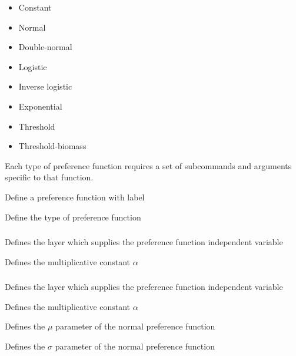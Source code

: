 \begin{itemize}
	\item Constant
	\item Normal
	\item Double-normal
	\item Logistic
	\item Inverse logistic
	\item Exponential
	\item Threshold
	\item Threshold-biomass	
\end{itemize}

Each type of preference function requires a set of subcommands and arguments specific to that function.

 {Define a preference function with label}

 {Define the type of preference function}

\subsubsection[Constant]{}

 {Defines the layer which supplies the preference function independent variable}

 {Defines the multiplicative constant $\alpha$}

\subsubsection[Normal]{}

 {Defines the layer which supplies the preference function independent variable}

 {Defines the multiplicative constant $\alpha$}

 {Defines the $\mu$ parameter of the normal preference function}

 {Defines the $\sigma$ parameter of the normal preference function}


